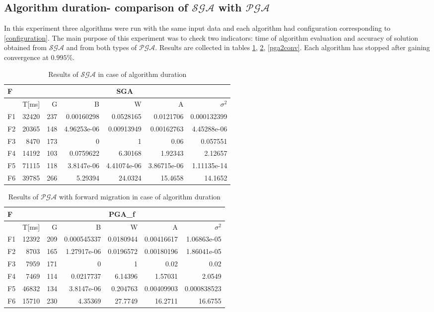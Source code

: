 \subsection{Algorithm duration- comparison of $\mathcal{SGA}$ with
$\mathcal{PGA}$}
In this experiment three algorithms were run with the same input data and
each algorithm had configuration corresponding to \ref{configuration}. The main
purpose of this experiment was to check two indicators: time of
algorithm evaluation and accuracy of solution obtained from $\mathcal{SGA}$ and
from both types of $\mathcal{PGA}$. Results are collected in tables \ref{sga},
\ref{pga1conv}, \ref{pga2conv}. Each algorithm has stopped after gaining
convergence at $0.995\%$. 
\begin{table}[!htpb]
	\label{sga}
	\caption{Results of $\mathcal{SGA}$ in case of algorithm duration}
	\centering
	\begin{tabular}{l||r|r|r|r|r|r|}
        \textsc{F} & \multicolumn{6}{c|}{SGA} \\ \hline
		          &T[ms]&G& B&W&A&$\sigma^2$ \\ \hline
		\textsc{F1}&32420&237&0.00160298&0.0528165&0.0121706&0.000132399\\ \hline
		\textsc{F2}&20365&148&4.96253e-06&0.00913949&0.00162763&4.45288e-06\\ \hline
		\textsc{F3}&8470&173&0&1&0.06&0.057551\\ \hline
		\textsc{F4}&14192&103&0.0759622&6.30168&1.92343&2.12657\\ \hline
		\textsc{F5}&71115&118&3.8147e-06&4.41074e-06&3.86715e-06&1.11135e-14\\ \hline
		\textsc{F6}&39785&266&5.29394&24.0324&15.4658&14.1652\\ \hline
	\end{tabular}\newline
\end{table}
\pagebreak
\begin{table}[!htpb]
	\label{pga1conv}
	\caption{Results of $\mathcal{PGA}$ with forward migration in case of
	algorithm duration}
	\centering
	\begin{tabular}{l||r|r|r|r|r|r|}
        \textsc{F} & \multicolumn{6}{c|}{PGA\_f} \\ \hline
		          &T[ms]&G& B&W&A&$\sigma^2$ \\ \hline
		\textsc{F1}&12392&209&0.000545337&0.0180944&0.00416617&1.06863e-05\\ \hline
		\textsc{F2}&8703&165&1.27917e-06&0.0196572&0.00180196&1.86041e-05\\ \hline
		\textsc{F3}&7959&171&0&1&0.02&0.02\\ \hline
		\textsc{F4}&7469&114&0.0217737&6.14396&1.57031&2.0549\\ \hline
		\textsc{F5}&46832&134&3.8147e-06&0.204763&0.00409903&0.000838523\\ \hline
		\textsc{F6}&15710&230&4.35369&27.7749&16.2711&16.6755\\ \hline
	\end{tabular}\newline
\end{table}
